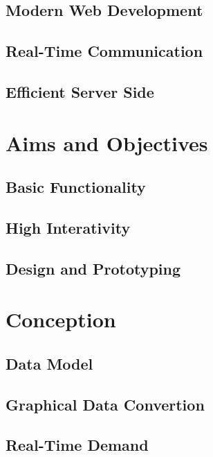 \documentclass[english, BCOR=6mm, twoside=true, open=right]{tudscrreprt}
\begin{document}
\section{Modern Web Development}
\section{Real-Time Communication}
\section{Efficient Server Side}

\chapter{Aims and Objectives}
\section{Basic Functionality}
\section{High Interativity}
\section{Design and Prototyping}


\chapter{Conception}
\section{Data Model}
\section{Graphical Data Convertion}
\section{Real-Time Demand}
\end{document}

